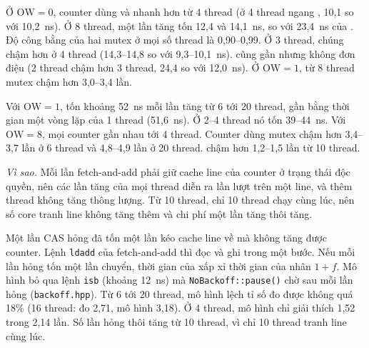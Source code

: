Ở $\mathrm{OW} = 0$, counter dùng  và  nhanh hơn
 từ 4 thread (ở 4 thread  ngang , 10,1 so với 10,2~ns).
Ở 8 thread, một lần tăng tốn 12,4 và 14,1~ns, so với 23,4~ns của . Độ công bằng của hai
mutex ở mọi số thread là 0,90--0,99. Ở 3 thread, chúng chậm hơn ở 4 thread (14,3--14,8 so với
9,3--10,1~ns).  cũng gần  nhưng không đơn điệu (2 thread chậm
hơn 3 thread, 24,4 so với 12,0~ns). Ở $\mathrm{OW} = 1$, từ 8 thread mutex chậm hơn 
3,0--3,4 lần.

Với $\mathrm{OW} = 1$,  tốn khoảng 52~ns mỗi lần tăng từ 6 tới 20 thread, gần bằng thời gian
một vòng lặp của 1 thread (51,6~ns). Ở 2--4 thread nó tốn 39--44~ns. Với $\mathrm{OW} = 8$, mọi counter
gần nhau tới 4 thread. Counter dùng mutex chậm hơn  3,4--3,7 lần ở 6 thread và 4,8--4,9 lần ở
20 thread.  chậm hơn  1,2--1,5 lần từ 10 thread.

\emph{Vì sao.} Mỗi lần fetch-and-add phải giữ cache line của counter ở trạng thái độc quyền, nên các lần
tăng của mọi thread diễn ra lần lượt trên một line, và thêm thread không tăng thông lượng. Từ 10 thread,
chỉ 10 thread chạy cùng lúc, nên số core tranh line không tăng thêm và chi phí một lần tăng thôi tăng.

Một lần CAS hỏng đã tốn một lần kéo cache line về mà không tăng được counter. Lệnh \texttt{ldadd} của
fetch-and-add thì đọc và ghi trong một bước. Nếu mỗi lần hỏng tốn một lần chuyển, thời gian của
 xấp xỉ thời gian của  nhân $1+f$. Mô hình bỏ qua lệnh \texttt{isb} (khoảng
12~ns) mà \texttt{NoBackoff::pause()} chờ sau mỗi lần hỏng (\texttt{backoff.hpp}). Từ 6 tới 20 thread,
mô hình lệch tỉ số đo được không quá 18\% (16 thread: đo 2,71, mô hình 3,18). Ở 4 thread, mô hình chỉ
giải thích 1,52 trong 2,14 lần. Số lần hỏng thôi tăng từ 10 thread, vì chỉ 10 thread tranh line cùng lúc.

